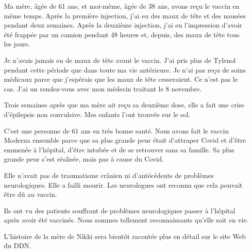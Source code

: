 Ma mère, âgée de 61 ans, et moi-même, âgée de 38 ans, avons reçu le vaccin en
même temps. Après la première injection, j'ai eu des maux de tête et des nausées
pendant deux semaines. Après la deuxième injection, j'ai eu l'impression d'avoir
été frappée par un camion pendant 48 heures et, depuis, des maux de tête tous
les jours.

Je n'avais jamais eu de maux de tête avant le vaccin. J'ai pris plus de Tylenol
pendant cette période que dans toute ma vie antérieure. Je n'ai pas reçu de
soins médicaux parce que j'espérais que les maux de tête cesseraient. Ce n'est
pas le cas. J'ai un rendez-vous avec mon médecin traitant le 8 novembre.

Trois semaines après que ma mère ait reçu sa deuxième dose, elle a fait une
crise d'épilepsie non convulsive. Mes enfants l'ont trouvée sur le sol.

C'est une personne de 61 ans en très bonne santé. Nous avons fait le vaccin
Moderna ensemble parce que sa plus grande peur était d'attraper Covid et d'être
emmenée à l'hôpital, d'être intubée et de se retrouver sans sa famille. Sa plus
grande peur s'est réalisée, mais pas à cause du Covid.

Elle n'avait pas de traumatisme crânien ni d'antécédents de problèmes
neurologiques. Elle a failli mourir. Les neurologues ont reconnu que cela
pouvait être dû au vaccin.

Ils ont vu des patients souffrant de problèmes neurologiques passer à l'hôpital
après avoir été vaccinés. Nous sommes tellement reconnaissants qu'elle soit en
vie.

L'histoire de la mère de Nikki sera bientôt racontée plus en détail sur le site
Web du DDN.
